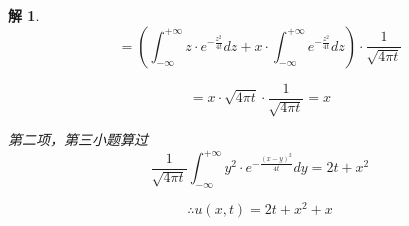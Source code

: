 \documentclass[12pt,a4paper]{article}
\newtheorem*{solution}{解}
\begin{document}
\begin{solution}
\begin{equation*}
	= \left( \int_{-\infty}^{+\infty} z \cdot e^{-\frac{z^2}{4t}} dz + x \cdot \int_{-\infty}^{+\infty} e^{-\frac{z^2}{4t}} dz \right) \cdot \frac{1}{\sqrt{4\pi t}}
\end{equation*}

\begin{equation*}
	= x \cdot \sqrt{4\pi t} \cdot \frac{1}{\sqrt{4\pi t}} = x
\end{equation*}


第二项，第三小题算过
\begin{equation*}
\frac{1}{\sqrt{4\pi t}}\int_{-\infty}^{+\infty} y^2 \cdot e^{-\frac{(x-y)^2}{4t}} dy=2t+x^2
\end{equation*}



\begin{equation*}
	\therefore u(x,t) = 2t + x^2 + x
\end{equation*}

	
	
\end{solution}
\end{document}
